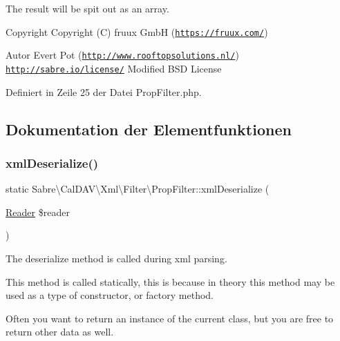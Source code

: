The result will be spit out as an array.

\begin{DoxyCopyright}{Copyright}
Copyright (C) fruux GmbH (\href{https://fruux.com/}{\tt https\+://fruux.\+com/}) 
\end{DoxyCopyright}
\begin{DoxyAuthor}{Autor}
Evert Pot (\href{http://www.rooftopsolutions.nl/}{\tt http\+://www.\+rooftopsolutions.\+nl/})  \href{http://sabre.io/license/}{\tt http\+://sabre.\+io/license/} Modified B\+SD License 
\end{DoxyAuthor}


Definiert in Zeile 25 der Datei Prop\+Filter.\+php.



\subsection{Dokumentation der Elementfunktionen}
\mbox{\label{class_sabre_1_1_cal_d_a_v_1_1_xml_1_1_filter_1_1_prop_filter_adb11581e4195decbf52f2132dc7f2c83}} 
\subsubsection{\texorpdfstring{xml\+Deserialize()}{xmlDeserialize()}}
{\footnotesize\ttfamily static Sabre\textbackslash{}\+Cal\+D\+A\+V\textbackslash{}\+Xml\textbackslash{}\+Filter\textbackslash{}\+Prop\+Filter\+::xml\+Deserialize (\begin{DoxyParamCaption}\item[{\mbox{\hyperlink{class_sabre_1_1_xml_1_1_reader}{Reader}}}]{\$reader }\end{DoxyParamCaption})\hspace{0.3cm}{\ttfamily [static]}}

The deserialize method is called during xml parsing.

This method is called statically, this is because in theory this method may be used as a type of constructor, or factory method.

Often you want to return an instance of the current class, but you are free to return other data as well.

